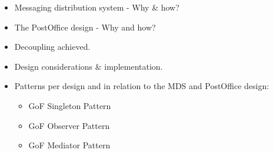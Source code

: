 
\begin{itemize}
	\item Messaging distribution system - Why \& how?
	\item The PostOffice design - Why and how?
	\item Decoupling achieved.
	\item Design considerations \& implementation.
	\item Patterns per design and in relation to the MDS and PostOffice design:
	\begin{itemize}
		\item GoF Singleton Pattern
		\item GoF Observer Pattern
		\item GoF Mediator Pattern
	\end{itemize}
\end{itemize}